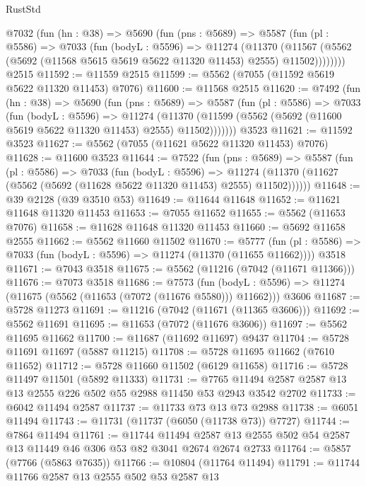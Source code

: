\begin{lexlean}{RustStd}
\begin{coremodule}
    @7032
      (fun (hn : @38) =>
      @5690
        (fun (pns : @5689) =>
        @5587
          (fun (pl : @5586) =>
          @7033
            (fun (bodyL : @5596) =>
            @11274
              (@11370
                (@11567 (@5562 (@5692 (@11568 @5615 @5619 @5622 @11320 @11453) @2555) @11502))))))))
    @2515
@11592 := @11559 @2515
@11599 := @5562 (@7055 (@11592 @5619 @5622 @11320 @11453) @7076)
@11600 := @11568 @2515
@11620 := @7492
    (fun (hn : @38) =>
    @5690
      (fun (pns : @5689) =>
      @5587
        (fun (pl : @5586) =>
        @7033
          (fun (bodyL : @5596) =>
          @11274
            (@11370 (@11599 (@5562 (@5692 (@11600 @5619 @5622 @11320 @11453) @2555) @11502)))))))
    @3523
@11621 := @11592 @3523
@11627 := @5562 (@7055 (@11621 @5622 @11320 @11453) @7076)
@11628 := @11600 @3523
@11644 := @7522
    (fun (pns : @5689) =>
    @5587
      (fun (pl : @5586) =>
      @7033
        (fun (bodyL : @5596) =>
        @11274 (@11370 (@11627 (@5562 (@5692 (@11628 @5622 @11320 @11453) @2555) @11502))))))
@11648 := @39 @2128 (@39 @3510 @53)
@11649 := @11644 @11648
@11652 := @11621 @11648 @11320 @11453
@11653 := @7055 @11652
@11655 := @5562 (@11653 @7076)
@11658 := @11628 @11648 @11320 @11453
@11660 := @5692 @11658 @2555
@11662 := @5562 @11660 @11502
@11670 := @5777
    (fun (pl : @5586) => @7033 (fun (bodyL : @5596) => @11274 (@11370 (@11655 @11662))))
    @3518
@11671 := @7043 @3518
@11675 := @5562 (@11216 (@7042 (@11671 @11366)))
@11676 := @7073 @3518
@11686 := @7573
    (fun (bodyL : @5596) => @11274 (@11675 (@5562 (@11653 (@7072 (@11676 @5580))) @11662)))
    @3606
@11687 := @5728 @11273
@11691 := @11216 (@7042 (@11671 (@11365 @3606)))
@11692 := @5562 @11691
@11695 := @11653 (@7072 (@11676 @3606))
@11697 := @5562 @11695 @11662
@11700 := @11687 (@11692 @11697) @9437
@11704 := @5728 @11691 @11697 (@5887 @11215)
@11708 := @5728 @11695 @11662 (@7610 @11652)
@11712 := @5728 @11660 @11502 (@6129 @11658)
@11716 := @5728 @11497 @11501 (@5892 @11333)
@11731 := @7765 @11494 @2587 @2587 @13 @13 @2555 @226 @502 @55 @2988 @11450 @53 @2943 @3542 @2702
@11733 := @6042 @11494 @2587
@11737 := @11733 @73 @13 @73 @2988
@11738 := @6051 @11494
@11743 := @11731 (@11737 (@6050 (@11738 @73)) @7727)
@11744 := @7864 @11494
@11761 := @11744
    @11494
    @2587
    @13
    @2555
    @502
    @54
    @2587
    @13
    @11449
    @46
    @306
    @53
    @82
    @3041
    @2674
    @2674
    @2733
@11764 := @5857 (@7766 (@5863 @7635))
@11766 := @10804 (@11764 @11494)
@11791 := @11744
    @11766
    @2587
    @13
    @2555
    @502
    @53
    @2587
    @13

\end{coremodule}
\end{lexlean}
